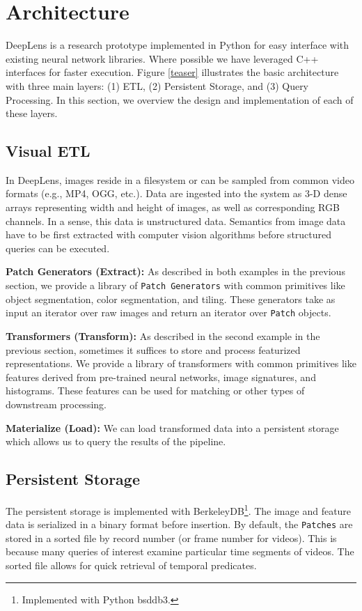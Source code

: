 \section{Architecture}
\textsf{DeepLens} is a research prototype implemented in Python for easy interface with existing neural network libraries. 
Where possible we have leveraged C++ interfaces for faster execution.
Figure \ref{teaser} illustrates the basic architecture with three main layers: (1) ETL, (2) Persistent Storage, and (3) Query Processing.
In this section, we overview the design and implementation of each of these layers.

\subsection{Visual ETL}
\label{subsection:visualETL}
In \textsf{DeepLens},  images reside in a filesystem or can be sampled from common video formats (e.g., MP4, OGG, etc.). Data are ingested into the system as 3-D dense arrays representing width and height of images, as well as  corresponding RGB channels. In a sense, this data is unstructured data. Semantics from image data have to be first extracted with computer vision algorithms before structured queries can be executed. 

\vspace{0.25em}
\noindent \textbf{Patch Generators (Extract): } As described in both examples in the previous section, we provide a library of \texttt{Patch Generators} with common primitives like object segmentation, color segmentation, and tiling. These generators take as input an iterator over raw images and return an iterator over \texttt{Patch} objects.

\vspace{0.25em}
\noindent \textbf{Transformers (Transform): } As described in the second example in the previous section, sometimes it suffices to store and process featurized representations. We provide a library of transformers with common primitives like features derived from pre-trained neural networks, image signatures, and histograms. These features can be used for matching or other types of downstream processing.

\vspace{0.25em}
\noindent \textbf{Materialize (Load): } We can load transformed data into a persistent storage which allows us to query the results of the pipeline.

\subsection{Persistent Storage}
The persistent storage is implemented with BerkeleyDB\footnote{Implemented with Python bsddb3.}. The image and feature data is serialized in a binary format before insertion. By default, the \texttt{Patches} are stored in a sorted file by record number (or frame number for videos). This is because many queries of interest examine particular time segments of videos.
The sorted file allows for quick retrieval of temporal predicates.

